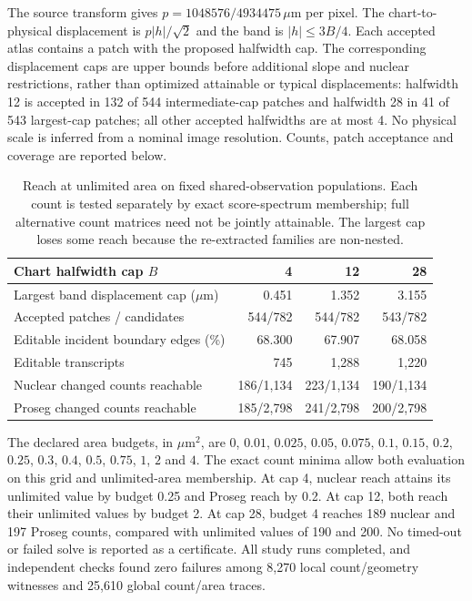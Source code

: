 The source transform gives $p=1048576/4934475\,\mu\mathrm m$ per pixel. The chart-to-physical displacement is $p|h|/\sqrt2$ and the band is $|h|\le3B/4$. Each accepted atlas contains a patch with the proposed halfwidth cap. The corresponding displacement caps are upper bounds before additional slope and nuclear restrictions, rather than optimized attainable or typical displacements: halfwidth 12 is accepted in 132 of 544 intermediate-cap patches and halfwidth 28 in 41 of 543 largest-cap patches; all other accepted halfwidths are at most 4. No physical scale is inferred from a nominal image resolution. Counts, patch acceptance and coverage are reported below.

\begin{table}[ht]\centering
\begin{tabular}{lrrr}\toprule
Chart halfwidth cap $B$&4&12&28\\\midrule
Largest band displacement cap ($\mu\mathrm m$)&0.451&1.352&3.155\\
Accepted patches / candidates&544/782&544/782&543/782\\
Editable incident boundary edges (\%)&68.300&67.907&68.058\\
Editable transcripts&745&1,288&1,220\\
Nuclear changed counts reachable&186/1,134&223/1,134&190/1,134\\
Proseg changed counts reachable&185/2,798&241/2,798&200/2,798\\\bottomrule
\end{tabular}
\caption{Reach at unlimited area on fixed shared-observation populations. Each count is tested separately by exact score-spectrum membership; full alternative count matrices need not be jointly attainable. The largest cap loses some reach because the re-extracted families are non-nested.}
\end{table}

The declared area budgets, in $\mu\mathrm m^2$, are $0$, $0.01$, $0.025$, $0.05$, $0.075$, $0.1$, $0.15$, $0.2$, $0.25$, $0.3$, $0.4$, $0.5$, $0.75$, $1$, $2$ and $4$. The exact count minima allow both evaluation on this grid and unlimited-area membership. At cap 4, nuclear reach attains its unlimited value by budget 0.25 and Proseg reach by 0.2. At cap 12, both reach their unlimited values by budget 2. At cap 28, budget 4 reaches 189 nuclear and 197 Proseg counts, compared with unlimited values of 190 and 200. No timed-out or failed solve is reported as a certificate. All study runs completed, and independent checks found zero failures among 8,270 local count/geometry witnesses and 25,610 global count/area traces.

